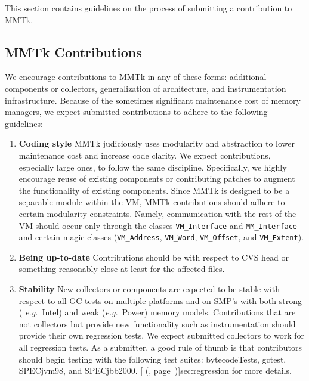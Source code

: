 This section contains guidelines on the process of
submitting a contribution to MMTk.


\subsection{MMTk Contributions}

We encourage contributions to MMTk in any of these forms: additional
components or collectors, generalization of architecture,
and instrumentation infrastructure.  Because of the sometimes significant
maintenance cost of memory managers, we expect submitted contributions
to adhere to the following guidelines:


\begin{enumerate}

\item {\bf Coding style}  
MMTk judiciously uses modularity and abstraction to lower maintenance
cost and increase code clarity.  We expect contributions, especially
large ones, to follow the same discipline.  Specifically, we highly
encourage reuse of existing components or contributing patches to
augment the functionality of existing components.  Since MMTk is
designed to be a separable module within the VM, MMTk contributions
should adhere to certain modularity constraints.  Namely,
communication with the rest of the VM should occur only through the
classes {\tt VM\_Interface} and {\tt MM\_Interface} and certain magic classes
({\tt VM\_Address}, {\tt VM\_Word}, {\tt VM\_Offset}, and {\tt VM\_Extent}).

\item {\bf Being up-to-date}  
Contributions should be with respect to CVS head or something
reasonably close at least for the affected files.

\item { \bf Stability}  
New collectors or components are expected to be stable with respect to
all GC tests on multiple platforms and on SMP's with both strong ({\it
e.g.}\ Intel\Rweb{}) and weak ({\it e.g.}\ Power) memory models.  Contributions
that are not collectors but provide new functionality such as
instrumentation should provide their own regression tests.
We expect submitted collectors to work for all regression tests.
As a submitter, a good rule of thumb is that contributors should begin
testing with the following test suites: bytecodeTests, gctest, 
SPECjvm\Rweb{}98, and SPECjbb\Rweb{}2000.  [ (\Ref,
page~\Pageref)]{sec:regression} for more details. 


\end{enumerate}
